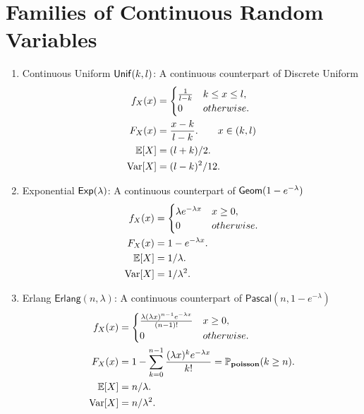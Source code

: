 \section{Families of Continuous Random Variables}
\begin{enumerate}
    \item Continuous Uniform $\mathsf{Unif}(k,l)$: A continuous counterpart of Discrete Uniform {
        \begin{align*}
            f_X(x) 
            &= {
                \begin{cases}
                \frac{1}{l-k} & k\leq x \leq l, \\
                0             & otherwise.
                \end{cases} } \\
            F_X(x) 
            &= \frac{x-k}{l-k}. \qquad x\in (k,l)\\
            \E{X}
            &= (l+k)/2. \\
            \Var[X] 
            &= (l-k)^2/12. \\
        \end{align*}
    }
    \item Exponential $\mathsf{Exp}(\lambda)$: A continuous counterpart of $\mathsf{Geom}(1-e^{-\lambda})$ {
        \begin{align*}
            f_X(x) 
            &= {
                \begin{cases}
                    \lambda e^{-\lambda x} & x\geq 0, \\
                    0                      & otherwise.
                \end{cases}
            } \\
            F_X(x) 
            &= 1-e^{-\lambda x}. \\
            \E{X} 
            &= 1/\lambda. \\
            \Var[X]
            &= 1/\lambda^2.
        \end{align*}
    }
    \item Erlang $\mathsf{Erlang}(n,\lambda)$: A continuous counterpart of  $\mathsf{Pascal}(n,1-e^{-\lambda})${
        \begin{align*}
            f_X(x)
            &= {
                \begin{cases}
                    \frac{\lambda (\lambda x)^{n-1}e^{-\lambda x}}{(n-1)!} & x\geq 0, \\
                    0                                              & otherwise.
                \end{cases}
            } \\
            F_X(x)
            &= 1-\sum_{k=0}^{n-1}\frac{(\lambda x)^ke^{-\lambda x}}{k!} = \mathbb{P}_{\mathbf{poisson}}(k\geq n). \\
            \E{X}
            &= n/\lambda. \\
            \Var[X]
            &= n/\lambda^2.
        \end{align*}
    }
\end{enumerate}


